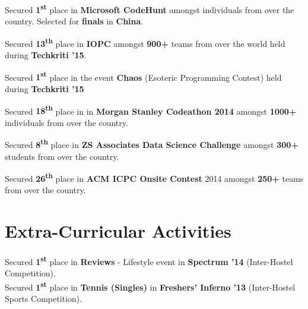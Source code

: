 \documentclass[a4paper]{norm-resume}
\begin{document}
\begin{tightitemize}
	\item Secured \textbf{1\textsuperscript{st}} place in \textbf{Microsoft CodeHunt} amongst individuals from over the country. Selected for \textbf{finals} in \textbf{China}.
	\item Secured \textbf{13\textsuperscript{th}} place in \textbf{IOPC} amongst \textbf{900+} teams from over the world held during \textbf{Techkriti '15}.
	\item Secured \textbf{1\textsuperscript{st}} place in the event \textbf{Chaos} (Esoteric Programming Contest) held during \textbf{Techkriti '15}
	\item Secured \textbf{18\textsuperscript{th}} place in in \textbf{Morgan Stanley Codeathon 2014} amongst \textbf{1000+} individuals from over the country.
	\item Secured \textbf{8\textsuperscript{th}} place in \textbf{ZS Associates Data Science Challenge} amongst \textbf{300+} students from over the country.
	\item Secured \textbf{26\textsuperscript{th}} place in \textbf{ACM ICPC Onsite Contest} 2014 amongst \textbf{250+} teams from over the country.
\end{tightitemize}

\vspace{0mm}	%

\section{Extra-Curricular Activities \hrulefill}

\vspace{1mm} %
	
	Secured \textbf{1\textsuperscript{st}} place in \textbf{Reviews} - Lifestyle event in \textbf{Spectrum '14} (Inter-Hostel Competition).\\
	Secured \textbf{1\textsuperscript{st}} place in \textbf{Tennis (Singles)} in \textbf{Freshers' Inferno '13} (Inter-Hostel Sports Competition).\\	
\end{document}
